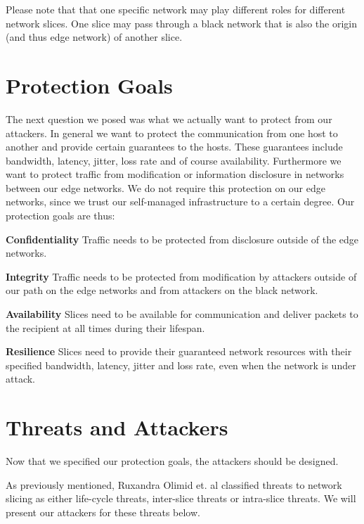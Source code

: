 Please note that that one specific network may play different roles for different network slices. One slice may pass through a black network that is also the origin (and thus edge network) of another slice.


\section{Protection Goals}
\label{protection_goals}
The next question we posed was what we actually want to protect from our attackers. In general we want to protect the communication from one host to another and provide certain guarantees to the hosts. These guarantees include bandwidth, latency, jitter, loss rate and of course availability. Furthermore we want to protect traffic from modification or information disclosure in networks between our edge networks. We do not require this protection on our edge networks, since we trust our self-managed infrastructure to a certain degree. Our protection goals are thus:
\begin{description}[style=multiline, labelwidth=0.7cm]
    \item[\namedlabel{P1}{P1}] \textbf{Confidentiality} Traffic needs to be protected from disclosure outside of the edge networks.
    \item[\namedlabel{P2}{P2}] \textbf{Integrity} Traffic needs to be protected from modification by attackers outside of our path on the edge networks and from attackers on the black network.
    \item[\namedlabel{P3}{P3}] \textbf{Availability} Slices need to be available for communication and deliver packets to the recipient at all times during their lifespan.
    \item[\namedlabel{P4}{P4}] \textbf{Resilience} Slices need to provide their guaranteed network resources with their specified bandwidth, latency, jitter and loss rate, even when the network is under attack.
\end{description}

\section{Threats and Attackers}
\label{adversaries}
Now that we specified our protection goals, the attackers should be designed.

As previously mentioned, Ruxandra Olimid et. al \cite{SE2} classified threats to network slicing as either life-cycle threats, inter-slice threats or intra-slice threats. We will present our attackers for these threats below.

